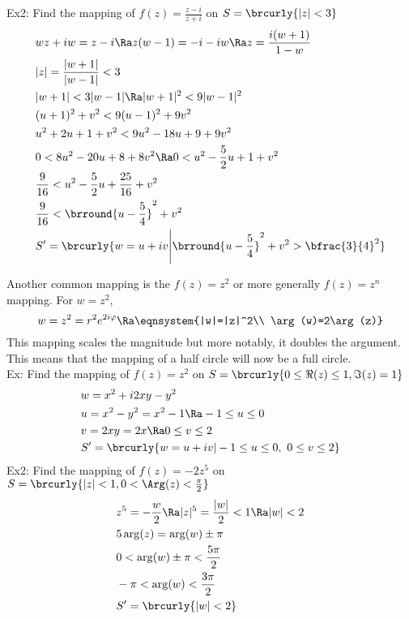 Ex2: Find the mapping of $f(z)=\frac{z-i}{z+i}$ on $S=\brcurly{|z|<3}$
\begin{align*}
    &wz+iw=z-i\Ra z(w-1)=-i-iw\Ra z=\frac{i(w+1)}{1-w}\\
    &|z|=\frac{|w+1|}{|w-1|}<3\\
    &|w+1|<3|w-1|\Ra |w+1|^2<9|w-1|^2\\
    &(u+1)^2+v^2<9(u-1)^2+9v^2\\
    &u^2+2u+1+v^2<9u^2-18u+9+9v^2\\
    &0<8u^2-20u+8+8v^2\Ra 0<u^2-\frac{5}{2}u+1+v^2\\
    &\frac{9}{16}<u^2-\frac{5}{2}u+\frac{25}{16}+v^2\\
    &\frac{9}{16}<\brround{u-\frac{5}{4}}^2+v^2\\
    &S'=\brcurly{w=u+iv\Bigg\vert\brround{u-\frac{5}{4}}^2+v^2>\bfrac{3}{4}^2}
\end{align*}

Another common mapping is the $f(z)=z^2$ or more generally $f(z)=z^n$ mapping.
For $w=z^2$,
\[w=z^2=r^2e^{2i\varphi}\Ra \eqnsystem{|w|=|z|^2\\ \arg(w)=2\arg(z)}\]
This mapping scales the magnitude but more notably, it doubles the argument. This means that the mapping of a half circle will now be a full circle.\\

Ex: Find the mapping of $f(z)=z^2$ on $S=\brcurly{0\leq \Re(z)\leq1,\Im(z)=1}$
\begin{align*}
    &w=x^2+i2xy-y^2\\
    &u=x^2-y^2=x^2-1\Ra -1\leq u\leq 0\\
    &v=2xy=2x\Ra 0\leq v\leq 2\\
    &S'=\brcurly{w=u+iv|-1\leq u\leq 0,\ 0\leq v\leq 2}
\end{align*}
Ex2: Find the mapping of $f(z)=-2z^5$ on $S=\brcurly{|z|<1,0<\Arg(z)<\frac{\pi}{2}}$
\begin{align*}
    &z^5=-\frac{w}{2}\Ra |z|^5=\frac{|w|}{2}<1\Ra |w|<2\\
    &5\arg(z)=\arg(w)\pm\pi \\
    &0<\arg(w)\pm\pi <\frac{5\pi}{2}\\
    &-\pi<\arg(w)<\frac{3\pi}{2}\\
    &S'=\brcurly{|w|<2}
\end{align*}

